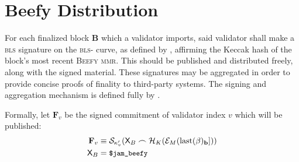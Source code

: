 \section{Beefy Distribution}\label{sec:beefy}

For each finalized block $\mathbf{B}$ which a validator imports, said validator shall make a \textsc{bls} signature on the \textsc{bls}- curve, as defined by \cite{bls12-381}, affirming the Keccak hash of the block's most recent \textsc{Beefy} \textsc{mmr}. This should be published and distributed freely, along with the signed material. These signatures may be aggregated in order to provide concise proofs of finality to third-party systems. The signing and aggregation mechanism is defined fully by \cite{cryptoeprint:2022/1611}.

Formally, let $\mathbf{F}_v$ be the signed commitment of validator index $v$ which will be published:
\begin{align}\label{eq:beefysignedcommitment}
  \mathbf{F}_v &\equiv \mathcal{S}_{\kappa'_v}(\mathsf{X}_B\frown\mathcal{H}_K(\mathcal{E}_M(\text{last}(\beta)_\mathbf{b}]))\\
  \mathsf{X}_B &= \text{{\small \texttt{\$jam\_beefy}}}
\end{align}
